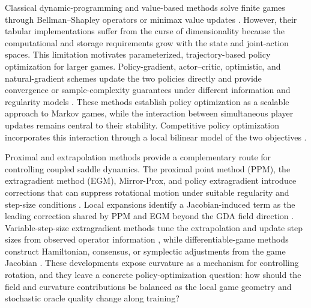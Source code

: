 \documentclass[journal]{IEEEtran}
\theoremstyle{remark}
\begin{document}
	Classical dynamic-programming and value-based methods solve finite games through Bellman--Shapley operators or minimax value updates \cite{Shapley1953StochasticGames,Littman1994MarkovGames,Iyengar2005RobustDP,NilimElGhaoui2005}.
	However, their tabular implementations suffer from the curse of dimensionality because the computational and storage requirements grow with the state and joint-action spaces.
		This limitation motivates parameterized, trajectory-based policy optimization for larger games.
	Policy-gradient, actor--critic, optimistic, and natural-gradient schemes update the two policies directly and provide convergence or sample-complexity guarantees under different information and regularity models \cite{Sutton2000PolicyGradient,Wei2021LastIterate,Zhao2022EfficientPO,Zhang2022UnifiedPO,Alacaoglu2022NACMG}.
	These methods establish policy optimization as a scalable approach to Markov games, while the interaction between simultaneous player updates remains central to their stability.
	Competitive policy optimization incorporates this interaction through a local bilinear model of the two objectives \cite{Prajapat2021CoPO}.
	
	Proximal and extrapolation methods provide a complementary route for controlling coupled saddle dynamics.
	The proximal point method (PPM), the extragradient method (EGM), Mirror-Prox, and policy extragradient introduce corrections that can suppress rotational motion under suitable regularity and step-size conditions \cite{Rockafellar1976PPM,Korpelevich1976Extragradient,Nemirovski2004MirrorProx,Mokhtari2020UnifiedEG,CenWeiChi2024FastPolicyEG}.
	Local expansions identify a Jacobian-induced term as the leading correction shared by PPM and EGM beyond the GDA field direction \cite{Lu2022ODE,Mokhtari2020UnifiedEG}.
	Variable-step-size extragradient methods tune the extrapolation and update step sizes from observed operator information \cite{Hsieh2020DSEG,Antonakopoulos2021AdaProx}, while differentiable-game methods construct Hamiltonian, consensus, or symplectic adjustments from the game Jacobian \cite{Balduzzi2018Mechanics,Letcher2019DifferentiableGameMechanics,Mescheder2018GANConvergence,Loizou2020SHGD}.
	These developments expose curvature as a mechanism for controlling rotation, and they leave a concrete policy-optimization question: how should the field and curvature contributions be balanced as the local game geometry and stochastic oracle quality change along training?
	
\end{document}

